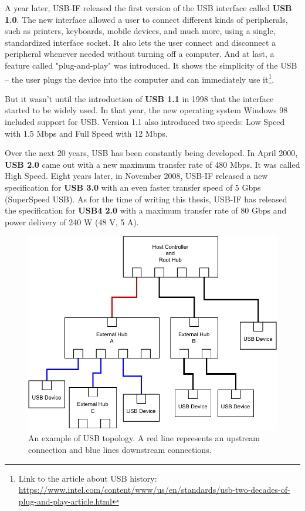 A year later, USB-IF released the first version of the USB interface called \textbf{USB 1.0}. The new interface allowed a user to connect different kinds of peripherals, such as printers, keyboards, mobile devices, and much more, using a single, standardized interface socket. It also lets the user connect and disconnect a peripheral whenever needed without turning off a computer. And at last, a feature called "plug-and-play" was introduced. It shows the simplicity of the USB \--- the user plugs the device into the computer and can immediately use it\footnote{Link to the article about USB history: \url{https://www.intel.com/content/www/us/en/standards/usb-two-decades-of-plug-and-play-article.html}}.

But it wasn't until the introduction of \textbf{USB 1.1} in 1998 that the interface started to be widely used. In that year, the new operating system Windows 98 included support for USB. Version 1.1 also introduced two speeds: Low Speed with 1.5 Mbps and Full Speed with 12 Mbps.

Over the next 20 years, USB has been constantly being developed. In April 2000, \textbf{USB 2.0} came out with a new maximum transfer rate of 480 Mbps. It was called High Speed. Eight years later, in November 2008, USB-IF released a new specification for \textbf{USB 3.0} with an even faster transfer speed of 5 Gbps (SuperSpeed USB). As for the time of writing this thesis, USB-IF has released the specification for \textbf{USB4 2.0} with a maximum transfer rate of 80 Gbps and power delivery of 240 W (48 V, 5 A).

\begin{figure}[ht]
    \centering
    \includegraphics[width=0.7\linewidth]{./obrazky-figures/usb_hub_model.pdf}
    \caption{An example of USB topology. A red line represents an upstream connection and blue lines downstream connections.}
    \label{fig:usb_topology}
\end{figure}
